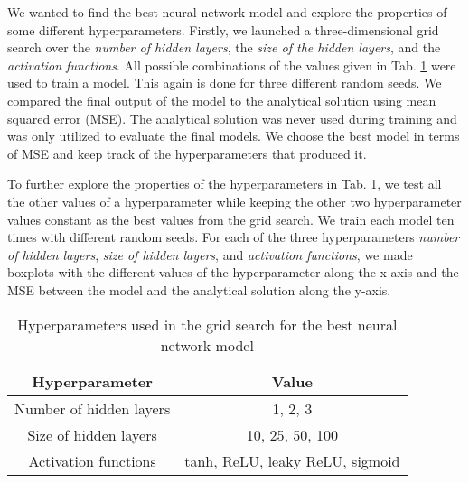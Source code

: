 We wanted to find the best neural network model and explore the properties of some different hyperparameters. 
Firstly, we launched a three-dimensional grid search over the \textit{number of hidden layers}, the \textit{size of the hidden layers}, and the \textit{activation functions}. 
All possible combinations of the values given in Tab. \ref{tab:hyperparams} were used to train a model. 
This again is done for three different random seeds. 
We compared the final output of the model to the analytical solution using mean squared error (MSE). 
The analytical solution was never used during training and was only utilized to evaluate the final models. 
We choose the best model in terms of MSE and keep track of the hyperparameters that produced it. 

To further explore the properties of the hyperparameters in Tab. \ref{tab:hyperparams}, we test all the other values of a hyperparameter while keeping the other two hyperparameter values constant as the best values from the grid search. 
We train each model ten times with different random seeds.
For each of the three hyperparameters \textit{number of hidden layers}, \textit{size of hidden layers}, and \textit{activation functions}, we made boxplots with the different values of the hyperparameter along the x-axis and the MSE between the model and the analytical solution along the y-axis. 


\begin{table}[h!]
    \centering
    \begin{tabular}{|c|c|}
    \hline
        \textbf{Hyperparameter} & \textbf{Value}  \\ \hline
        Number of hidden layers & 1, 2, 3  \\ \hline
        Size of hidden layers & 10, 25, 50, 100 \\\hline
        Activation functions & tanh, ReLU, leaky ReLU, sigmoid \\ \hline
    \end{tabular}
    \caption{Hyperparameters used in the grid search for the best neural network model }
    \label{tab:hyperparams}
\end{table}
